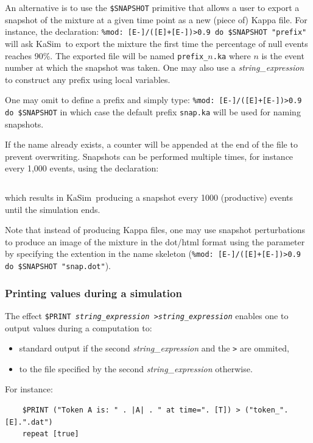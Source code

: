 \documentclass[11pt]{book}
\def\KaSim{\textsf{KaSim}}
\def\ttt#1{\texttt{#1}}
\begin{document}
An alternative is to use the \ttt{\$SNAPSHOT} primitive
that allows a user to export a snapshot of the mixture
at a given time point as a new (piece of) Kappa file.  For instance,
the declaration:
\lstinline[language=kappa]*%mod: [E-]/([E]+[E-])>0.9 do $SNAPSHOT "prefix"*
will ask \KaSim~to export
the mixture the first time the percentage of null
events reaches 90\%. The exported file will be named
\ttt{prefix\_$n$.ka} where $n$ is the event number at which the
snapshot was taken. One may also use a \textit{string\_expression} to
construct any prefix using local variables.

One may omit to define a prefix and simply type:
\lstinline[language=kappa]!%mod: [E-]/([E]+[E-])>0.9 do $SNAPSHOT!
in which case the default prefix \ttt{snap.ka} will be used for naming snapshots.

If the name already exists, a counter will be appended at the end of
the file to prevent overwriting. Snapshots can be performed multiple
times, for instance every 1,000 events, using the
declaration:
\begin{lstlisting}[language=kappa]
%mod: ([E] [mod] 1000)=0 do $SNAPSHOT "abc.ka" repeat [true]
\end{lstlisting}
which results in \KaSim~producing a snapshot every 1000 (productive) events until the simulation ends.

Note that instead of producing Kappa files, one may use snapshot
perturbations to produce an image of the mixture in the
dot/html format using the parameter by specifying the extention in the
name skeleton
(\lstinline[language=kappa]!%mod: [E-]/([E]+[E-])>0.9 do $SNAPSHOT "snap.dot"!).

\subsubsection{Printing values during a simulation}
The effect \ttt{\$PRINT \textit{string\_expression}
   >\textit{string\_expression}} enables one to output values during a
computation to:
\begin{itemize}
\item standard output if the second \textit{string\_expression} and
  the \ttt{>} are ommited,
\item to the file specified by the second \textit{string\_expression} otherwise.
\end{itemize}
For instance:
\begin{lstlisting}[language=kappa]
%mod: |A|<0 do
    $PRINT ("Token A is: " . |A| . " at time=". [T]) > ("token_".[E].".dat")
    repeat [true]
\end{lstlisting}
\end{document}
